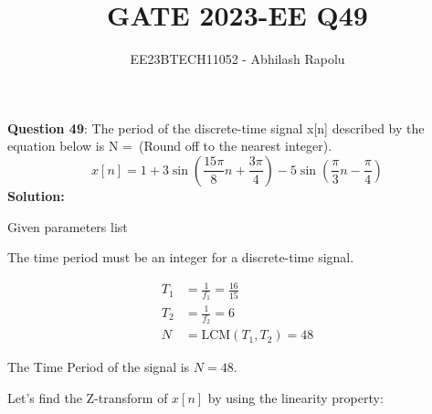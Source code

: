 \documentclass[journal,12pt,twocolumn]{IEEEtran}
\title{GATE 2023-EE Q49}
\author{EE23BTECH11052 - Abhilash Rapolu}
\begin{document}
\maketitle
\newpage
\textbf{Question 49}: The period of the discrete-time signal x[n] described by the equation below is N =\ (Round off to the nearest integer).
$$x[n] = 1 + 3\sin\left(\frac{15\pi}{8}n + \frac{3\pi}{4}\right) - 5\sin\left(\frac{\pi}{3}n - \frac{\pi}{4}\right)$$
\textbf{Solution:}
\begin{table}[htbp]
\centering

\caption{Given parameters list}
\end{table}

The time period must be an integer for a discrete-time signal.

\begin{align}
T_1 &= \frac{1}{f_1} = \frac{16}{15} \\
T_2 &= \frac{1}{f_2} = 6 \\
N &= \text{LCM}(T_1, T_2) = 48
\end{align}

The Time Period of the signal is \(N = 48\).

Let's find the Z-transform of $x[n]$ by using the linearity property:
\end{document}
